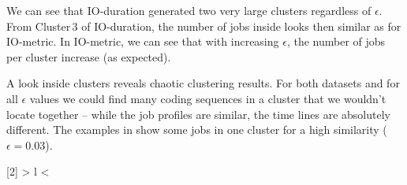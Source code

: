 \documentclass{jhps}
\begin{document}
We can see that IO-duration generated two very large clusters regardless of $\epsilon$.
From Cluster\,3 of IO-duration, the number of jobs inside looks then similar as for IO-metric.
In IO-metric, we can see that with increasing $\epsilon$, the number of jobs per cluster increase (as expected).

A look inside clusters reveals chaotic clustering results.
For both datasets and for all $\epsilon$ values we could find many coding sequences in a cluster that we wouldn't locate together -- while the job profiles are similar, the time lines are absolutely different.
The examples in  show some jobs in one cluster for a high similarity ($\epsilon = 0.03$).

\def\rd{3}
\newcolumntype{R}[2]{%
    >{\bgroup}%
    l%
    <{\egroup}%
}
\newcommand*\rot{\multicolumn{1}{R{45}{1em}}}%
\end{document}
